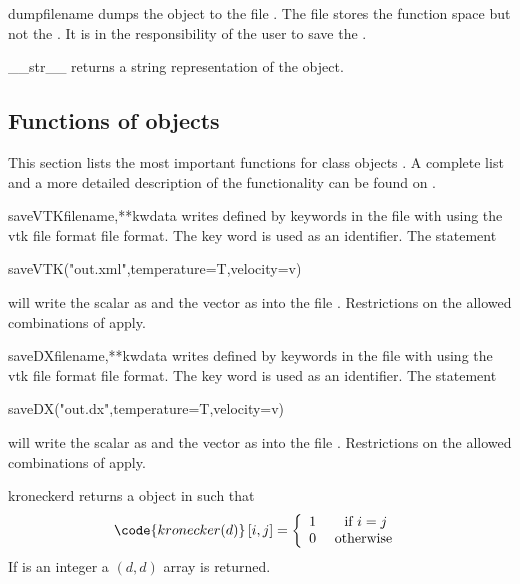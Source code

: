 \begin{methoddesc}[Data]{dump}{filename}
dumps the \Data object to the file . The file stores the
function space but not the \Domain. It is in the responsibility of the user to
save the \Domain.
\end{methoddesc}

\begin{methoddesc}[Data]{__str__}{}
returns a string representation of the object.
\end{methoddesc}

\subsection{Functions of \Data objects}
This section lists the most important functions for \Data class objects .
A complete list and a more detailed description of the functionality can be found on \ReferenceGuide.
\begin{funcdesc}{saveVTK}{filename,**kwdata}
writes \Data defined by keywords in the file with  using the
vtk file format \VTK file format. The key word is used as an identifier. The statement
\begin{python}
  saveVTK("out.xml",temperature=T,velocity=v)
\end{python}
will write the scalar  as  and the vector  as   into the
file . Restrictions on the allowed combinations of \FunctionSpace apply.
\end{funcdesc}
\begin{funcdesc}{saveDX}{filename,**kwdata}
writes \Data defined by keywords in the file with  using the
vtk file format \OpenDX file format. The key word is used as an identifier. The statement
\begin{python}
  saveDX("out.dx",temperature=T,velocity=v)
\end{python}
will write the scalar  as  and the vector  as   into the
file . Restrictions on the allowed combinations of \FunctionSpace apply.
\end{funcdesc}
\begin{funcdesc}{kronecker}{d}
returns a \RankTwo \Data object in \FunctionSpace {} such that
\begin{equation}
\code{kronecker(d)}\left[ i,j\right] = \left\{
\begin{array}{cc}
1 & \mbox{ if } i=j \\
0 & \mbox{ otherwise }
\end{array}
\right.
\end{equation}
If  is an integer a $(d,d)$ \numpy array is returned.
\end{funcdesc}
